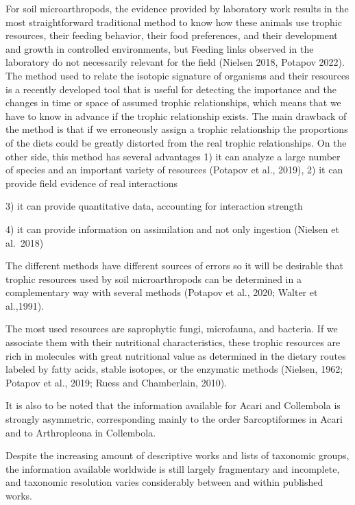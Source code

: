 \documentclass[10pt,oneside]{article}
\begin{document}
For soil microarthropods, the evidence provided by laboratory work
results in the most straightforward traditional method to know how these
animals use trophic resources, their feeding behavior, their food
preferences, and their development and growth in controlled
environments, but Feeding links observed in the laboratory do not
necessarily relevant for the field (Nielsen 2018, Potapov 2022). The
method used to relate the isotopic signature of organisms and their
resources is a recently developed tool that is useful for detecting the
importance and the changes in time or space of assumed trophic
relationships, which means that we have to know in advance if the
trophic relationship exists. The main drawback of the method is that if
we erroneously assign a trophic relationship the proportions of the
diets could be greatly distorted from the real trophic relationships. On
the other side, this method has several advantages 1) it can analyze a
large number of species and an important variety of resources (Potapov
et al., 2019), 2) it can provide field evidence of real interactions

3) it can provide quantitative data, accounting for interaction strength

4) it can provide information on assimilation and not only ingestion
(Nielsen et al.~2018)

The different methods have different sources of errors so it will be
desirable that trophic resources used by soil microarthropods can be
determined in a complementary way with several methods (Potapov et al.,
2020; Walter et al.,1991).

The most used resources are saprophytic fungi, microfauna, and bacteria.
If we associate them with their nutritional characteristics, these
trophic resources are rich in molecules with great nutritional value as
determined in the dietary routes labeled by fatty acids, stable
isotopes, or the enzymatic methods (Nielsen, 1962; Potapov et al., 2019;
Ruess and Chamberlain, 2010).

It is also to be noted that the information available for Acari and
Collembola is strongly asymmetric, corresponding mainly to the order
Sarcoptiformes in Acari and to Arthropleona in Collembola.

Despite the increasing amount of descriptive works and lists of
taxonomic groups, the information available worldwide is still largely
fragmentary and incomplete, and taxonomic resolution varies considerably
between and within published works.
\end{document}
